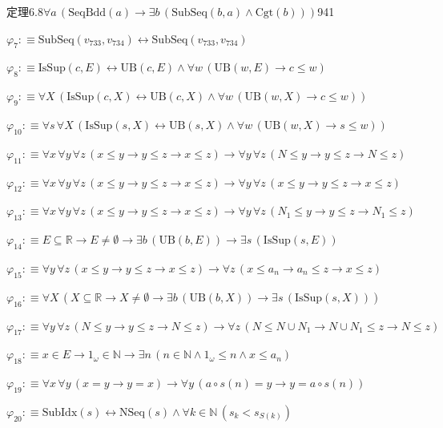 \begin{fullproof}{定理6.8}{$\forall a\,(\mathrm{SeqBdd}(a) \to \exists b\,(\mathrm{SubSeq}(b,a) \land \mathrm{Cgt}(b)))$}{941}
\begin{abbrevlist}
\item $\varphi_{7} :\equiv \mathrm{SubSeq}(v_{733},v_{734}) \leftrightarrow \mathrm{SubSeq}(v_{733},v_{734})$
\item $\varphi_{8} :\equiv \mathrm{IsSup}(c,E) \leftrightarrow \mathrm{UB}(c,E) \land \forall w\,(\mathrm{UB}(w,E) \to c \leq w)$
\item $\varphi_{9} :\equiv \forall X\,(\mathrm{IsSup}(c,X) \leftrightarrow \mathrm{UB}(c,X) \land \forall w\,(\mathrm{UB}(w,X) \to c \leq w))$
\item $\varphi_{10} :\equiv \forall s\,\forall X\,(\mathrm{IsSup}(s,X) \leftrightarrow \mathrm{UB}(s,X) \land \forall w\,(\mathrm{UB}(w,X) \to s \leq w))$
\item $\varphi_{11} :\equiv \forall x\,\forall y\,\forall z\,(x \leq y \to y \leq z \to x \leq z) \to \forall y\,\forall z\,(N \leq y \to y \leq z \to N \leq z)$
\item $\varphi_{12} :\equiv \forall x\,\forall y\,\forall z\,(x \leq y \to y \leq z \to x \leq z) \to \forall y\,\forall z\,(x \leq y \to y \leq z \to x \leq z)$
\item $\varphi_{13} :\equiv \forall x\,\forall y\,\forall z\,(x \leq y \to y \leq z \to x \leq z) \to \forall y\,\forall z\,(N_{1} \leq y \to y \leq z \to N_{1} \leq z)$
\item $\varphi_{14} :\equiv E \subseteq \mathbb{R} \to E \neq \emptyset \to \exists b\,(\mathrm{UB}(b,E)) \to \exists s\,(\mathrm{IsSup}(s,E))$
\item $\varphi_{15} :\equiv \forall y\,\forall z\,(x \leq y \to y \leq z \to x \leq z) \to \forall z\,(x \leq a_{n} \to a_{n} \leq z \to x \leq z)$
\item $\varphi_{16} :\equiv \forall X\,(X \subseteq \mathbb{R} \to X \neq \emptyset \to \exists b\,(\mathrm{UB}(b,X)) \to \exists s\,(\mathrm{IsSup}(s,X)))$
\item $\varphi_{17} :\equiv \forall y\,\forall z\,(N \leq y \to y \leq z \to N \leq z) \to \forall z\,(N \leq N \cup N_{1} \to N \cup N_{1} \leq z \to N \leq z)$
\item $\varphi_{18} :\equiv x \in E \to 1_{\omega} \in \mathbb{N} \to \exists n\,(n \in \mathbb{N} \land 1_{\omega} \leq n \land x \leq a_{n})$
\item $\varphi_{19} :\equiv \forall x\,\forall y\,(x = y \to y = x) \to \forall y\,(a \circ s(n) = y \to y = a \circ s(n))$
\item $\varphi_{20} :\equiv \mathrm{SubIdx}(s) \leftrightarrow \mathrm{NSeq}(s) \land \forall k \in \mathbb{N}\,(s_{k} < s_{S(k)})$

\end{abbrevlist}
\end{fullproof}
